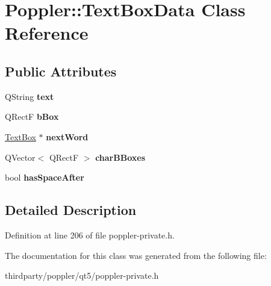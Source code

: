 \hypertarget{class_poppler_1_1_text_box_data}{}\section{Poppler\+:\+:Text\+Box\+Data Class Reference}
\label{class_poppler_1_1_text_box_data}
\subsection*{Public Attributes}
\begin{DoxyCompactItemize}
\item 
\mbox{\label{class_poppler_1_1_text_box_data_a44ad337c31d18e05cd83865313641c65}} 
Q\+String {\bfseries text}
\item 
\mbox{\label{class_poppler_1_1_text_box_data_ab58a5197e4980e502159add3b111fef4}} 
Q\+RectF {\bfseries b\+Box}
\item 
\mbox{\label{class_poppler_1_1_text_box_data_ac22ca2437828e188757bacf7e62a369a}} 
\hyperlink{class_poppler_1_1_text_box}{Text\+Box} $\ast$ {\bfseries next\+Word}
\item 
\mbox{\label{class_poppler_1_1_text_box_data_a6b001724f2e7c115b3256e289fd93ba3}} 
Q\+Vector$<$ Q\+RectF $>$ {\bfseries char\+B\+Boxes}
\item 
\mbox{\label{class_poppler_1_1_text_box_data_a1b6889cb2f1e7e0e989bdcd04b1a1970}} 
bool {\bfseries has\+Space\+After}
\end{DoxyCompactItemize}


\subsection{Detailed Description}


Definition at line 206 of file poppler-\/private.\+h.



The documentation for this class was generated from the following file\+:\begin{DoxyCompactItemize}
\item 
thirdparty/poppler/qt5/poppler-\/private.\+h\end{DoxyCompactItemize}
